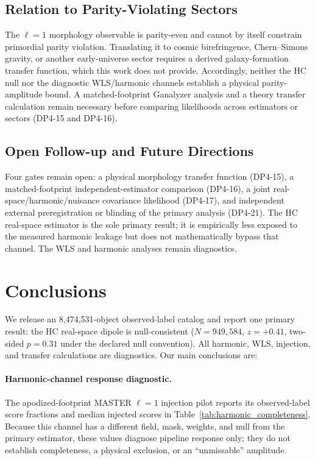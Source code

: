 \documentclass[aps,prd,twocolumn,superscriptaddress,preprintnumbers,nofootinbib,longbibliography,floatfix]{revtex4-2}
\begin{document}
\subsection{Relation to Parity-Violating Sectors}
\label{sec:parity_translation}

The $\ell=1$ morphology observable is parity-even and cannot by itself constrain primordial parity violation. Translating it to cosmic birefringence, Chern--Simons gravity, or another early-universe sector requires a derived galaxy-formation transfer function, which this work does not provide. Accordingly, neither the HC null nor the diagnostic WLS/harmonic channels establish a physical parity-amplitude bound. A matched-footprint Ganalyzer analysis and a theory transfer calculation remain necessary before comparing likelihoods across estimators or sectors (DP4-15 and DP4-16).

\subsection{Open Follow-up and Future Directions}

Four gates remain open: a physical morphology transfer function (DP4-15), a matched-footprint independent-estimator comparison (DP4-16), a joint real-space/harmonic/nuisance covariance likelihood (DP4-17), and independent external preregistration or blinding of the primary analysis (DP4-21). The HC real-space estimator is the sole primary result; it is empirically less exposed to the measured harmonic leakage but does not mathematically bypass that channel. The WLS and harmonic analyses remain diagnostics.

\section{Conclusions}
\label{sec:conclusions}

We release an 8,474,531-object observed-label catalog and report one primary result: the HC real-space dipole is null-consistent ($N=949{,}584$, $z=+0.41$, two-sided $p=0.31$ under the declared null convention). All harmonic, WLS, injection, and transfer calculations are diagnostics. Our main conclusions are:

\paragraph{Harmonic-channel response diagnostic.}
The apodized-footprint MASTER $\ell=1$ injection pilot reports its observed-label score fractions and median injected scores in Table~\ref{tab:harmonic_completeness}. Because this channel has a different field, mask, weights, and null from the primary estimator, these values diagnose pipeline response only; they do not establish completeness, a physical exclusion, or an ``unmissable'' amplitude.
\end{document}
